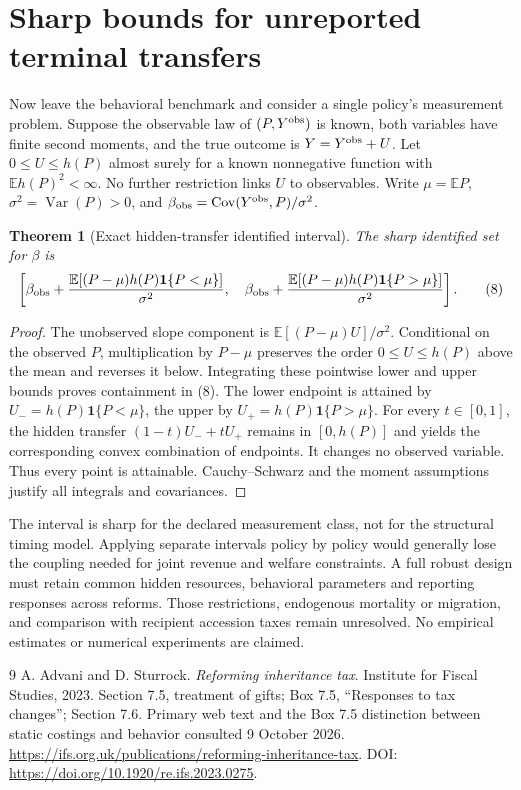 \documentclass[11pt]{article}
\newtheorem{theorem}{Theorem}
\theoremstyle{remark}
\newcommand{\E}{\mathbb E}
\newcommand{\Var}{\operatorname{Var}}
\newcommand{\Cov}{\operatorname{Cov}}
\newcommand{\Ind}{\mathbf 1}
\begin{document}
\section{Sharp bounds for unreported terminal transfers}
Now leave the behavioral benchmark and consider a single policy's
measurement problem. Suppose the observable law of $(P,Y^{\rm obs})$ is
known, both variables have finite second moments, and the true outcome is
$Y=Y^{\rm obs}+U$. Let $0\leq U\leq h(P)$ almost surely for a known
nonnegative function with $\E h(P)^2<\infty$. No further restriction links
$U$ to observables. Write $\mu=\E P$, $\sigma^2=\Var(P)>0$, and
$\beta_{\rm obs}=\Cov(Y^{\rm obs},P)/\sigma^2$.

\begin{theorem}[Exact hidden-transfer identified interval]
The sharp identified set for $\beta$ is
\[
 \left[
 \beta_{\rm obs}+\frac{\E[(P-\mu)h(P)\Ind\{P<\mu\}]}{\sigma^2},\quad
 \beta_{\rm obs}+\frac{\E[(P-\mu)h(P)\Ind\{P>\mu\}]}{\sigma^2}
 \right]. \tag{8}
\]
\end{theorem}
\begin{proof}
The unobserved slope component is
$\E[(P-\mu)U]/\sigma^2$. Conditional on the observed $P$, multiplication
by $P-\mu$ preserves the order $0\leq U\leq h(P)$ above the mean
and reverses it below. Integrating these pointwise lower and upper bounds
proves containment in (8). The lower endpoint is attained by
$U_-=h(P)\Ind\{P<\mu\}$, the upper by
$U_+=h(P)\Ind\{P>\mu\}$. For every $t\in[0,1]$, the hidden transfer
$(1-t)U_-+tU_+$ remains in $[0,h(P)]$ and yields the corresponding convex
combination of endpoints. It changes no observed variable. Thus every
point is attainable. Cauchy--Schwarz and the moment assumptions justify
all integrals and covariances.
\end{proof}
The interval is sharp for the declared measurement class, not for the
structural timing model. Applying separate intervals policy by policy
would generally lose the coupling needed for joint revenue and welfare
constraints. A full robust design must retain common hidden resources,
behavioral parameters and reporting responses across reforms. Those
restrictions, endogenous mortality or migration, and comparison with
recipient accession taxes remain unresolved. No empirical estimates or
numerical experiments are claimed.

\begin{thebibliography}{9}
 A. Advani and D. Sturrock.
\emph{Reforming inheritance tax}. Institute for Fiscal Studies, 2023.
Section 7.5, treatment of gifts; Box 7.5, ``Responses to tax changes'';
Section 7.6. Primary web text and the Box 7.5 distinction between static
costings and behavior consulted 9 October 2026.
\url{https://ifs.org.uk/publications/reforming-inheritance-tax}.
DOI: \url{https://doi.org/10.1920/re.ifs.2023.0275}.
\end{thebibliography}
\end{document}
